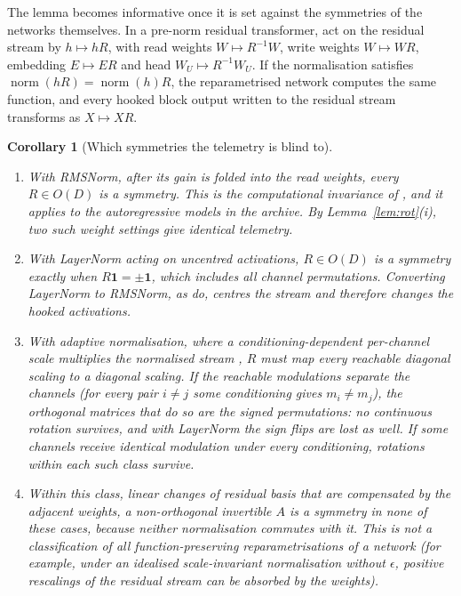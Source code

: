 \documentclass[11pt]{article}
\newtheorem{corollary}[theorem]{Corollary}
\theoremstyle{definition}
\begin{document}
The lemma becomes informative once it is set against the symmetries of the networks themselves. In a pre-norm residual transformer, act on the residual stream by $h\mapsto hR$, with read weights $W\mapsto R^{-1}W$, write weights $W\mapsto WR$, embedding $E\mapsto ER$ and head $W_U\mapsto R^{-1}W_U$. If the normalisation satisfies $\operatorname{norm}(hR)=\operatorname{norm}(h)R$, the reparametrised network computes the same function, and every hooked block output written to the residual stream transforms as $X\mapsto XR$.

\begin{corollary}[Which symmetries the telemetry is blind to]\label{cor:rot}
\begin{enumerate}
 \item[(a)] With RMSNorm, after its gain is folded into the read weights, every $R\in O(D)$ is a symmetry. This is the computational invariance of \citet[Theorem~1]{ashkboos2024slicegpt}, and it applies to the autoregressive models in the archive. By Lemma~\ref{lem:rot}(i), two such weight settings give identical telemetry.
 \item[(b)] With LayerNorm acting on uncentred activations, $R\in O(D)$ is a symmetry exactly when $R\mathbf 1=\pm\mathbf 1$, which includes all channel permutations. Converting LayerNorm to RMSNorm, as \citet{ashkboos2024slicegpt} do, centres the stream and therefore changes the hooked activations.
 \item[(c)] With adaptive normalisation, where a conditioning-dependent per-channel scale multiplies the normalised stream \citep{peebles2023scalable}, $R$ must map every reachable diagonal scaling to a diagonal scaling. If the reachable modulations separate the channels (for every pair $i\neq j$ some conditioning gives $m_i\neq m_j$), the orthogonal matrices that do so are the signed permutations: no continuous rotation survives, and with LayerNorm the sign flips are lost as well. If some channels receive identical modulation under every conditioning, rotations within each such class survive.
 \item[(d)] Within this class, linear changes of residual basis that are compensated by the adjacent weights, a non-orthogonal invertible $A$ is a symmetry in none of these cases, because neither normalisation commutes with it. This is not a classification of all function-preserving reparametrisations of a network (for example, under an idealised scale-invariant normalisation without $\epsilon$, positive rescalings of the residual stream can be absorbed by the weights).
\end{enumerate}
\end{corollary}
\end{document}
